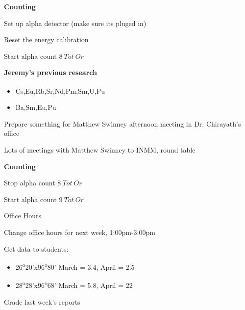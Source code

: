 \documentclass[idxtotoc,hyperref,openany,oneside]{labbook} %
\newcommand{\cmark}{\ding{51}}%
\newcommand{\done}{\rlap{$\square$}{\raisebox{2pt}{\large\hspace{1pt}\cmark}}%
  \hspace{-2.5pt}}
\newcommand{\tss}{\textsuperscript}
\begin{document}
\textbf{Counting}
\begin{todolist}
\item[\done]{Set up alpha detector (make sure its pluged in)}
\item[\done]{Reset the energy calibration}
\item[\done]{Start alpha count $\boxed{8\ Tot\ Or}$}
\end{todolist}

\textbf{Jeremy's previous research}
\begin{itemize}
\item{\tss{\done}Cs,Eu,Rb,Sr,Nd,Pm,Sm,U,Pu}
\item{Ba,Sm,Eu,Pu}
\end{itemize}




\begin{todolist}
\item[\done]{Prepare something for Matthew Swinney afternoon meeting in Dr. Chirayath's office}
\item[\done]{Lots of meetings with Matthew Swinney to INMM, round table}
\end{todolist}

\textbf{Counting}
\begin{todolist}
\item[\done]{Stop alpha count $\boxed{8\ Tot\ Or}$}
\item[\done]{Start alpha count $\boxed{9\ Tot\ Or}$}
\end{todolist}


\begin{todolist}
\item[\done]{Office Hours}
\item[\done]{Change office hours for next week, 1:00pm-3:00pm}
\item{Get data to students:}
  \begin{itemize}
  \item{26\tss{o}20'x96\tss{o}80' March = 3.4, April = 2.5}
  \item{28\tss{o}28'x96\tss{o}68' March = 5.8, April = 22}
  \end{itemize}
\item[\done]{Grade last week's reports}
\end{todolist}
\end{document}
